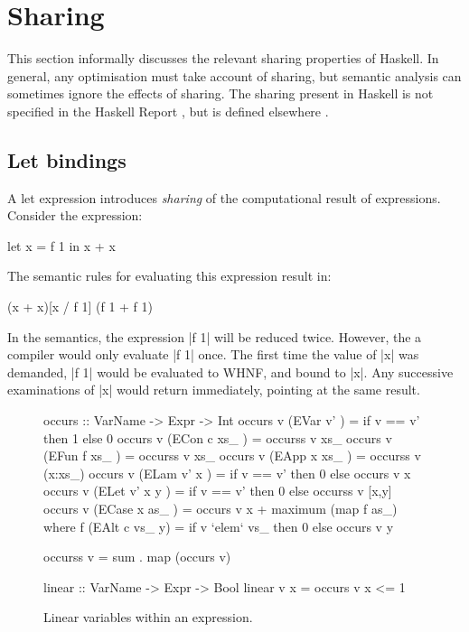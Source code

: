 \section{Sharing}
\label{secB:sharing}

This section informally discusses the relevant sharing properties of Haskell. In general, any optimisation must take account of sharing, but semantic analysis can sometimes ignore the effects of sharing. The sharing present in Haskell is not specified in the Haskell Report \cite{haskell}, but is defined elsewhere \cite{bakewell:space_semantics}.

\subsection{Let bindings}

A let expression introduces \textit{sharing} of the computational result of expressions. Consider the expression:

\begin{example}
\ignore\begin{code}
let x = f 1
in x + x
\end{code}

The semantic rules for evaluating this expression result in:

\ignore\begin{code}
(x + x)[x / f 1]
(f 1 + f 1)
\end{code}

In the semantics, the expression |f 1| will be reduced twice. However, the a compiler would only evaluate |f 1| once. The first time the value of |x| was demanded, |f 1| would be evaluated to WHNF, and bound to |x|. Any successive examinations of |x| would return immediately, pointing at the same result.
\end{example}

\begin{figure}
\begin{code}
occurs :: VarName -> Expr -> Int
occurs v (EVar v'      ) = if v == v' then 1 else 0
occurs v (ECon c xs_   ) = occurss v xs_
occurs v (EFun f xs_   ) = occurss v xs_
occurs v (EApp x xs_   ) = occurss v (x:xs_)
occurs v (ELam v' x    ) = if v == v' then 0 else occurs v x
occurs v (ELet v' x y  ) = if v == v' then 0 else occurss v [x,y]
occurs v (ECase x as_  ) = occurs v x + maximum (map f as_)
    where f (EAlt c vs_ y) = if v `elem` vs_ then 0 else occurs v y

occurss v = sum . map (occurs v)

linear :: VarName -> Expr -> Bool
linear v x = occurs v x <= 1
\end{code}
\caption{Linear variables within an expression.}
\label{figB:linear}
\end{figure}

